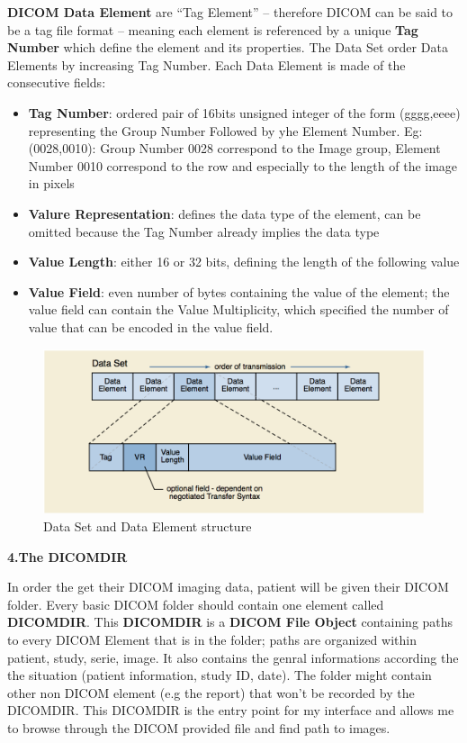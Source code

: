 \newline \vspace{5mm}
\textbf{DICOM Data Element} are “Tag Element” – therefore DICOM can be said to be a tag file format – meaning each element is referenced by a unique \textbf{Tag Number} which define the element and its properties. The Data Set order Data Elements by increasing Tag Number.
Each Data Element is made of the consecutive fields: 
\begin{itemize} 
\item \textbf{Tag Number}: ordered pair of 16bits unsigned integer of the form (gggg,eeee)  representing the Group Number Followed by yhe Element Number.
Eg: (0028,0010): Group Number 0028 correspond to the Image group, Element Number 0010 correspond to the row and especially to the length of the image in pixels 
\item \textbf{Valure Representation}: defines the data type of the element, can be omitted because the Tag Number already implies the data type
\item \textbf{Value Length}: either 16 or 32 bits, defining the length of the following value
\item \textbf{Value Field}: even number of bytes containing the value of the element; the value field can contain the Value Multiplicity, which specified the number of value that can be encoded in the value field. 
\end{itemize}

\begin{figure}[ht]
\centering
\includegraphics[width = 0.8\hsize]{./figures/DataSetandDataElement}
\caption{Data Set and Data Element structure}
\end{figure}
 

\clearpage

\textbf{4.The DICOMDIR}

\newline \vspace{5mm}
In order the get their DICOM imaging data, patient will be given their DICOM folder. Every basic DICOM folder should contain one element called \textbf{DICOMDIR}. This \textbf{DICOMDIR} is a \textbf{DICOM File Object} containing paths to every DICOM Element that is in the folder; paths are organized within patient, study, serie, image. It also contains the genral informations according the the situation (patient information, study ID, date). The folder might contain other non DICOM element (e.g the report) that won't be recorded by the DICOMDIR. This DICOMDIR is the entry point for my interface and allows me to browse through the DICOM provided file and find path to images.



